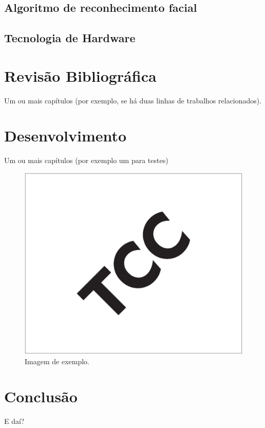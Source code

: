 \documentclass[12pt, %
openright, 
oneside, %
a4paper,    %
brazil]{facom-ufu-abntex2}
\begin{document}
\section{Algoritmo de reconhecimento facial}


\section{Tecnologia de Hardware}


\chapter{Revisão Bibliográfica}
Um ou mais capítulos (por exemplo, se há duas linhas de trabalhos relacionados).



\chapter{Desenvolvimento}
Um ou mais capítulos (por exemplo um para testes)


\begin{figure}[!ht]
    \centering
	\includegraphics[width=0.55\linewidth]{imagemExemplo.pdf}
	\caption[Isso é o que aparece no sumário]{Imagem de exemplo.}
	\label{fig:graficosVariandoTamanhoRede}
\end{figure}



\chapter[Conclusão]{Conclusão}
E daí?





\postextual
\end{document}
